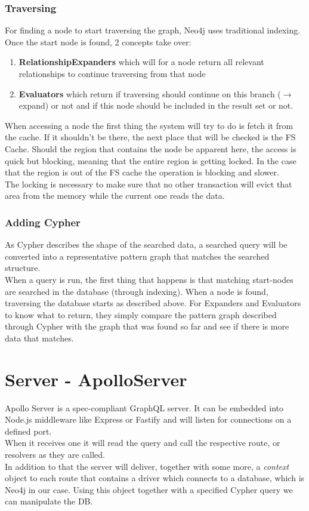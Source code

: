 \subsubsection{Traversing}
For finding a node to start traversing the graph, Neo4j uses traditional indexing. \citep[minute 32]{NeoInternals} Once the start node is found, 2 concepts take over:
\begin{enumerate}
\item \textbf{RelationshipExpanders} which will for a node return all relevant relationships to continue traversing from that node
\item \textbf{Evaluators} which return if traversing should continue on this branch ($ \rightarrow $ expand) or not and if this node should be included in the result set or not.
\end{enumerate}
When accessing a node the first thing the system will try to do is fetch it from the cache. If it shouldn't be there, the next place that will be checked is the FS Cache. Should the region that contains the node be apparent here, the access is quick but blocking, meaning that the entire region is getting locked. In the case that the region is out of the FS cache the operation is blocking and slower. \\
The locking is necessary to make sure that no other transaction will evict that area from the memory while the current one reads the data.

\subsubsection{Adding Cypher}
As Cypher describes the shape of the searched data, a searched query will be converted into a representative pattern graph that matches the searched structure. \\
When a query is run, the first thing that happens is that matching start-nodes are searched in the database (through indexing). When a node is found, traversing the database starts as described above. For Expanders and Evaluators to know what to return, they simply compare the pattern graph described through Cypher with the graph that was found so far and see if there is more data that matches. 

\section{Server - ApolloServer}
Apollo Server is a spec-compliant GraphQL server. It can be embedded into Node.js middleware like Express or Fastify \cite{ApolloServerIntro} and will listen for connections on a defined port. \\
When it receives one it will read the query and call the respective route, or resolvers as they are called. \\
In addition to that the server will deliver, together with some more, a \emph{context} object to each route that contains a driver which connects to a database, which is Neo4j in our case. Using this object together with a specified Cypher query we can manipulate the DB. 

